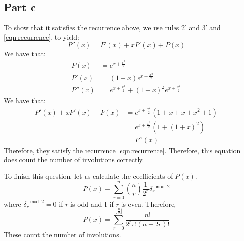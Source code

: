 \documentclass[]{article}
\begin{document}
\subsection*{Part c}
To show that it satisfies the recurrence above, we use rules 2' and 3' and \cref{eqn:recurrence}, to yield:
\begin{equation}
	P''(x) = P'(x) + xP'(x) + P(x)
\end{equation}
We have that:
\begin{align*}
	P(x) &= e^{x + \frac{x^2}{2}}\\
	P'(x) &= (1 + x)e^{x + \frac{x^2}{2}}\\
	P''(x) &= e^{x + \frac{x^2}{2}} + (1 + x)^2 e^{x + \frac{x^2}{2}}
\end{align*}
We have that:
\begin{align*}
	P'(x) + x P'(x) + P(x) &= e^{x + \frac{x^2}{2}} \left(1 + x + x + x^2 + 1\right)\\
	&= e^{x + \frac{x^2}{2}} \left(1 + (1 + x)^2 \right)\\
	&= P''(x)
\end{align*}
Therefore, they satisfy the recurrence \cref{eqn:recurrence}. Therefore, this equation does count the number of involutions correctly.

To finish this question, let us calculate the coefficients of $P(x)$. 
\begin{equation}
	[x^n/n!] P(x) = \sum_{r = 0}^{n} \binom{n}{r} \frac{1}{2^r}\delta_r^{\mod 2}
\end{equation}
where $\delta_r^{\mod 2} = 0$ if $r$ is odd and $1$ if $r$ is even. 
Therefore, 
\begin{equation}
	[x^n/n!] P(x) = \sum_{r = 0}^{\lfloor \frac{n}{2} \rfloor} \frac{n!}{2^r r!(n - 2r)!}
\end{equation}
These count the number of involutions.
\newpage
\end{document}
